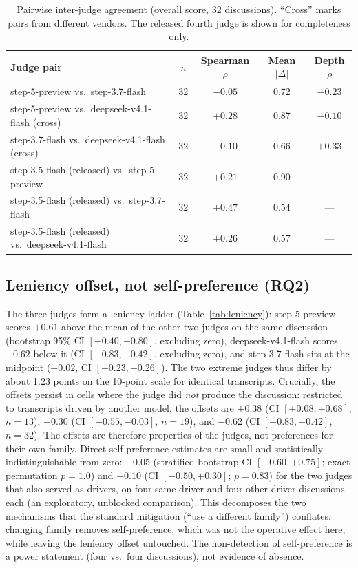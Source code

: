 \begin{table}[t]
\centering
\caption{Pairwise inter-judge agreement (overall score, 32 discussions).
``Cross'' marks pairs from different vendors. The released fourth judge
is shown for completeness only.}
\label{tab:agreement}
\small
\begin{tabular}{@{}lcccc@{}}
\toprule
Judge pair & $n$ & Spearman $\rho$ & Mean $\lvert\Delta\rvert$ & Depth $\rho$ \\
\midrule
step-5-preview vs.\ step-3.7-flash & 32 & $-0.05$ & 0.72 & $-0.23$ \\
step-5-preview vs.\ deepseek-v4.1-flash (cross) & 32 & $+0.28$ & 0.87 & $-0.10$ \\
step-3.7-flash vs.\ deepseek-v4.1-flash (cross) & 32 & $-0.10$ & 0.66 & $+0.33$ \\
\midrule
step-3.5-flash (released) vs.\ step-5-preview & 32 & $+0.21$ & 0.90 & --- \\
step-3.5-flash (released) vs.\ step-3.7-flash & 32 & $+0.47$ & 0.54 & --- \\
step-3.5-flash (released) vs.\ deepseek-v4.1-flash & 32 & $+0.26$ & 0.57 & --- \\
\bottomrule
\end{tabular}
\end{table}

\subsection{Leniency offset, not self-preference (RQ2)}

The three judges form a leniency ladder
(Table~\ref{tab:leniency}): step-5-preview scores $+0.61$ above the
mean of the other two judges on the same discussion (bootstrap 95\% CI
$[+0.40,+0.80]$, excluding zero), deepseek-v4.1-flash scores $-0.62$
below it (CI $[-0.83,-0.42]$, excluding zero), and step-3.7-flash sits
at the midpoint ($+0.02$, CI $[-0.23,+0.26]$). The two extreme judges
thus differ by about 1.23 points on the 10-point scale for identical
transcripts. Crucially, the offsets persist in cells where the judge did
\emph{not} produce the discussion: restricted to transcripts driven by
another model, the offsets are $+0.38$ (CI $[+0.08,+0.68]$, $n=13$),
$-0.30$ (CI $[-0.55,-0.03]$, $n=19$), and $-0.62$ (CI
$[-0.83,-0.42]$, $n=32$). The offsets are therefore properties of the
judges, not preferences for their own family. Direct self-preference
estimates are small and statistically indistinguishable from zero:
$+0.05$ (stratified bootstrap CI $[-0.60,+0.75]$; exact permutation
$p=1.0$) and $-0.10$ (CI $[-0.50,+0.30]$; $p=0.83$) for the two judges
that also served as drivers, on four same-driver and four other-driver
discussions each (an exploratory, unblocked comparison). This
decomposes the two mechanisms that the standard
mitigation (``use a different family'') conflates: changing family
removes self-preference, which was not the operative effect here, while
leaving the leniency offset untouched. The non-detection of
self-preference is a power statement (four vs.\ four discussions), not
evidence of absence.

